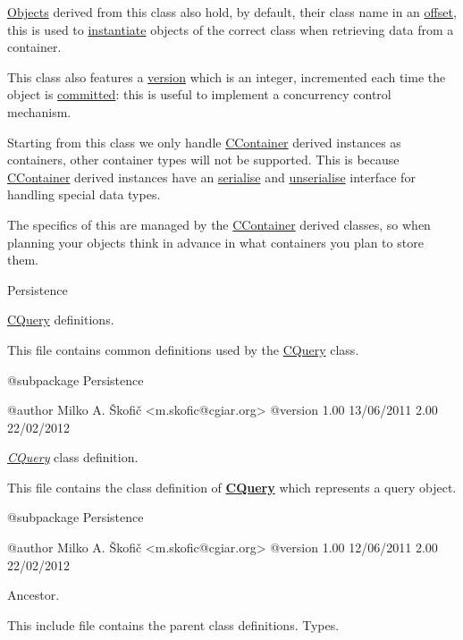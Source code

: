 \hyperlink{namespace_objects}{Objects} derived from this class also hold, by default, their class name in an \hyperlink{}{offset}, this is used to \hyperlink{}{instantiate} objects of the correct class when retrieving data from a container.

This class also features a \hyperlink{}{version} which is an integer, incremented each time the object is \hyperlink{}{committed}\-: this is useful to implement a concurrency control mechanism.

Starting from this class we only handle \hyperlink{class_c_container}{C\-Container} derived instances as containers, other container types will not be supported. This is because \hyperlink{class_c_container}{C\-Container} derived instances have an \hyperlink{class_c_mongo_data_wrapper_a0d37f7b47e1a1ac48846f6d10d08d846}{serialise} and \hyperlink{class_c_mongo_data_wrapper_aff82f7c69fa3641daf93d1f375e33501}{unserialise} interface for handling special data types.

The specifics of this are managed by the \hyperlink{class_c_container}{C\-Container} derived classes, so when planning your objects think in advance in what containers you plan to store them.

Persistence

\hyperlink{class_c_query}{C\-Query} definitions.

This file contains common definitions used by the \hyperlink{class_c_query}{C\-Query} class.

\begin{DoxyVerb}    @subpackage     Persistence

    @author         Milko A. Škofič <m.skofic@cgiar.org>
    @version        1.00 13/06/2011
                            2.00 22/02/2012\end{DoxyVerb}


{\itshape \hyperlink{class_c_query}{C\-Query}\/} class definition.

This file contains the class definition of {\bfseries \hyperlink{class_c_query}{C\-Query}} which represents a query object.

\begin{DoxyVerb}    @subpackage     Persistence

    @author         Milko A. Škofič <m.skofic@cgiar.org>
    @version        1.00 12/06/2011
                            2.00 22/02/2012\end{DoxyVerb}


Ancestor.

This include file contains the parent class definitions. Types.

